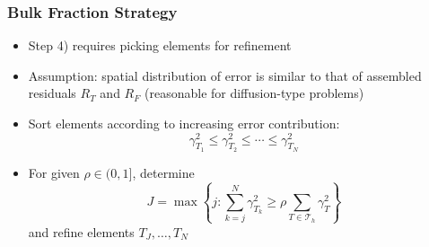 \documentclass[aspectratio=169,11pt]{beamer}
\theoremstyle{definition}
\begin{document}
\begin{frame}
\frametitle{Bulk Fraction Strategy}
\begin{itemize}
  \item Step 4) requires picking elements for refinement
  \item Assumption: spatial distribution of error is similar to that of
    assembled residuals $R_T$ and $R_F$ (reasonable for diffusion-type
    problems)
  \item Sort elements according to increasing error contribution:
    \begin{equation*}
      \gamma_{T_1}^2 \leq \gamma_{T_2}^2 \leq \cdots \leq \gamma_{T_N}^2
    \end{equation*}
  \item For given $\rho \in (0,1]$, determine
    \begin{equation*}
      J = \max \left\{ j \colon \sum_{k=j}^N \gamma_{T_k}^2 \geq \rho \sum_{T \in \mathcal{T}_h} \gamma_T^2 \right\}
    \end{equation*}
    and refine elements $T_J,\dots,T_N$
\end{itemize}
\end{frame}
\end{document}

